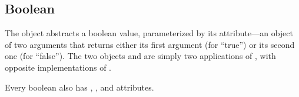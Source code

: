 
\subsection{Boolean}\label{sec:boolean}

The  object abstracts a boolean value, parameterized by
  its  attribute---an object of two arguments that returns either
  its first argument (for ``true'') or its second one (for ``false'').
The two objects  and  are simply two applications
  of , with opposite implementations of .

Every boolean also has , , and  attributes.
